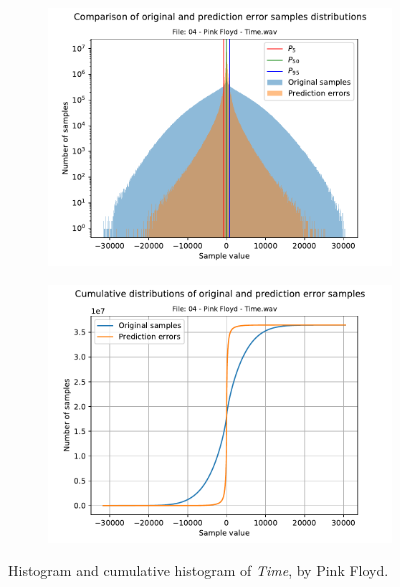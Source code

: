 \begin{figure}[h!]
	\centering
	\begin{subfigure}{0.45\textwidth}
		\centering
		\includegraphics[width=\linewidth]{images/wave_hists/04 - Pink Floyd - Time.wav_hist.pdf}
	\end{subfigure}%
	\begin{subfigure}{0.45\textwidth}
		\centering
		\includegraphics[width=\linewidth]{images/wave_hists/04 - Pink Floyd - Time.wav_hist_cum.pdf}
	\end{subfigure}
	\caption{Histogram and cumulative histogram of \textit{Time}, by Pink Floyd.}
	\label{fig:time_pink_floyd}
\end{figure}

